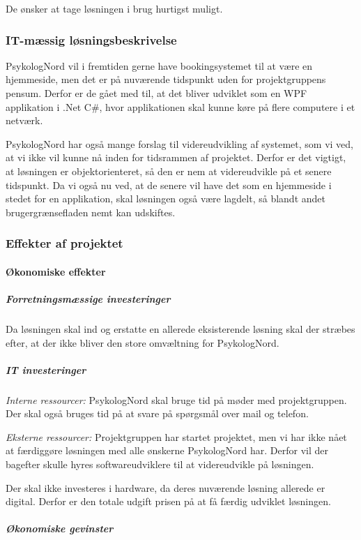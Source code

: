 De ønsker at tage løsningen i brug hurtigst muligt.

\subsubsection{IT-mæssig løsningsbeskrivelse}

PsykologNord vil i fremtiden gerne have bookingsystemet til at være en hjemmeside, men det er på nuværende tidspunkt uden for projektgruppens pensum.
Derfor er de gået med til, at det bliver udviklet som en WPF applikation i .Net C\#, hvor applikationen skal kunne køre på flere computere i et netværk.

PsykologNord har også mange forslag til videreudvikling af systemet, som vi ved, at vi ikke vil kunne nå inden for tidsrammen af projektet.
Derfor er det vigtigt, at løsningen er objektorienteret, så den er nem at videreudvikle på et senere tidspunkt.
Da vi også nu ved, at de senere vil have det som en hjemmeside i stedet for en applikation, skal løsningen også være lagdelt, så blandt andet brugergrænsefladen nemt kan udskiftes.

\subsubsection{Effekter af projektet}
\paragraph*{Økonomiske effekter}
\subparagraph*{Forretningsmæssige investeringer}

Da løsningen skal ind og erstatte en allerede eksisterende løsning skal der stræbes efter, at der ikke bliver den store omvæltning for PsykologNord.

\subparagraph{IT investeringer}

\textit{Interne ressourcer:} PsykologNord skal bruge tid på møder med projektgruppen. Der skal også bruges tid på at svare på spørgsmål over mail og telefon.

\textit{Eksterne ressourcer:} Projektgruppen har startet projektet, men vi har ikke nået at færdiggøre løsningen med alle ønskerne PsykologNord har.
Derfor vil der bagefter skulle hyres softwareudviklere til at videreudvikle på løsningen.

Der skal ikke investeres i hardware, da deres nuværende løsning allerede er digital. Derfor er den totale udgift prisen på at få færdig udviklet løsningen.

\subparagraph{Økonomiske gevinster}

